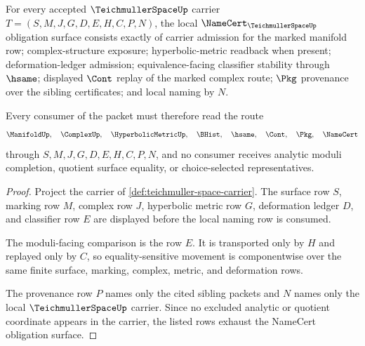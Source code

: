 \begin{theorem}
\label{thm:teichmuller-space-namecert-obligations}
For every accepted $\TeichmullerSpaceUp$ carrier $T=(S,M,J,G,D,E,H,C,P,N)$, the local $\NameCert_{\TeichmullerSpaceUp}$ obligation surface consists exactly of carrier admission for the marked manifold row; complex-structure exposure; hyperbolic-metric readback when present; deformation-ledger admission; equivalence-facing classifier stability through $\hsame$; displayed $\Cont$ replay of the marked complex route; $\Pkg$ provenance over the sibling certificates; and local naming by $N$.

Every consumer of the packet must therefore read the route
$$
\ManifoldUp,\quad \ComplexUp,\quad \HyperbolicMetricUp,\quad \BHist,\quad \hsame,\quad \Cont,\quad \Pkg,\quad \NameCert
$$
through $S,M,J,G,D,E,H,C,P,N$, and no consumer receives analytic moduli completion, quotient surface equality, or choice-selected representatives.
\end{theorem}
\begin{proof}
Project the carrier of \autoref{def:teichmuller-space-carrier}. The surface row $S$, marking row $M$, complex row $J$, hyperbolic metric row $G$, deformation ledger $D$, and classifier row $E$ are displayed before the local naming row is consumed.

The moduli-facing comparison is the row $E$. It is transported only by $H$ and replayed only by $C$, so equality-sensitive movement is componentwise over the same finite surface, marking, complex, metric, and deformation rows.

The provenance row $P$ names only the cited sibling packets and $N$ names only the local $\TeichmullerSpaceUp$ carrier. Since no excluded analytic or quotient coordinate appears in the carrier, the listed rows exhaust the NameCert obligation surface.
\end{proof}



